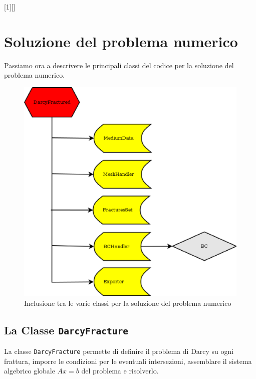 [1][]{}{}

\chapter{Soluzione del problema numerico}

Passiamo ora a descrivere le principali classi del codice per la soluzione del problema numerico.

\begin{figure}[h!]
\centering
\includegraphics[scale=.55]{img/subcap3_4/DarcyFractured.eps}
\caption{Inclusione tra le varie classi per la soluzione del problema numerico}\label{Inclusione classi DarcyFractured}
\end{figure}

\section{La Classe \texttt{DarcyFracture}}
La classe \texttt{DarcyFracture} permette di definire il problema di Darcy su ogni frattura, imporre le condizioni per le eventuali intersezioni, assemblare il sistema algebrico globale $ Ax=b $ del problema e risolverlo.\\

